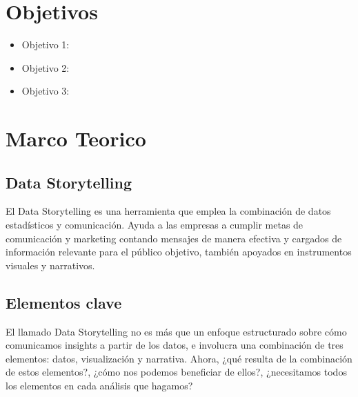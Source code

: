 \documentclass[preprint,12pt]{elsarticle}
\begin{document}
	

\section{Objetivos}
		\begin{itemize}
		\item Objetivo 1: 
		\item Objetivo 2: 
		\item Objetivo 3: 
	\end{itemize}

	

\section{Marco Teorico}
	\label{S:1}
\subsection{Data Storytelling}	

	El Data Storytelling es una herramienta que emplea la combinación de datos estadísticos y comunicación. Ayuda a las empresas a cumplir metas de comunicación y marketing contando mensajes de manera efectiva y cargados de información relevante para el público objetivo, también apoyados en instrumentos visuales y narrativos.\\
		
	\subsection{Elementos clave}
	
	El llamado Data Storytelling no es más que un enfoque estructurado sobre cómo comunicamos insights a partir de los datos, e involucra una combinación de tres elementos: datos, visualización y narrativa.
Ahora, ¿qué resulta de la combinación de estos elementos?, ¿cómo nos podemos beneficiar de ellos?, ¿necesitamos todos los elementos en cada análisis que hagamos?\\
\end{document}

